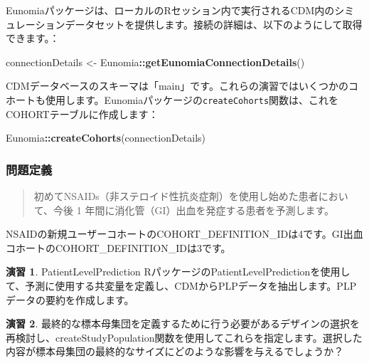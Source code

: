 \documentclass[
  11pt]{book}
\newenvironment{Shaded}{\begin{snugshade}}{\end{snugshade}}
\newcommand{\FunctionTok}[1]{\textcolor[rgb]{0.13,0.29,0.53}{\textbf{#1}}}
\newcommand{\NormalTok}[1]{#1}
\newcommand{\OtherTok}[1]{\textcolor[rgb]{0.56,0.35,0.01}{#1}}
\newcommand{\SpecialCharTok}[1]{\textcolor[rgb]{0.81,0.36,0.00}{\textbf{#1}}}
\theoremstyle{definition}
\theoremstyle{definition}
\theoremstyle{definition}
\newtheorem{exercise}{演習}[chapter]
\theoremstyle{definition}
\theoremstyle{remark}
\begin{document}
Eunomiaパッケージは、ローカルのRセッション内で実行されるCDM内のシミュレーションデータセットを提供します。接続の詳細は、以下のようにして取得できます。：

\begin{Shaded}
\begin{Highlighting}[]
\NormalTok{connectionDetails }\OtherTok{\textless{}{-}}\NormalTok{ Eunomia}\SpecialCharTok{::}\FunctionTok{getEunomiaConnectionDetails}\NormalTok{()}
\end{Highlighting}
\end{Shaded}

CDMデータベースのスキーマは「main」です。これらの演習ではいくつかのコホートも使用します。Eunomiaパッケージの\texttt{createCohorts}関数は、これをCOHORTテーブルに作成します：

\begin{Shaded}
\begin{Highlighting}[]
\NormalTok{Eunomia}\SpecialCharTok{::}\FunctionTok{createCohorts}\NormalTok{(connectionDetails)}
\end{Highlighting}
\end{Shaded}

\subsubsection*{問題定義}\label{ux554fux984cux5b9aux7fa9-1}

\begin{quote}
初めてNSAIDs（非ステロイド性抗炎症剤）を使用し始めた患者において、今後 1 年間に消化管（GI）出血を発症する患者を予測します。
\end{quote}

NSAIDの新規ユーザーコホートのCOHORT\_DEFINITION\_IDは4です。GI出血コホートのCOHORT\_DEFINITION\_IDは3です。

\begin{exercise}
\protect\hypertarget{exr:exercisePlp1}{}\label{exr:exercisePlp1}PatientLevelPrediction RパッケージのPatientLevelPredictionを使用して、予測に使用する共変量を定義し、CDMからPLPデータを抽出します。PLPデータの要約を作成します。
\end{exercise}

\begin{exercise}
\protect\hypertarget{exr:exercisePlp2}{}\label{exr:exercisePlp2}最終的な標本母集団を定義するために行う必要があるデザインの選択を再検討し、createStudyPopulation関数を使用してこれらを指定します。選択した内容が標本母集団の最終的なサイズにどのような影響を与えるでしょうか？
\end{exercise}
\end{document}
